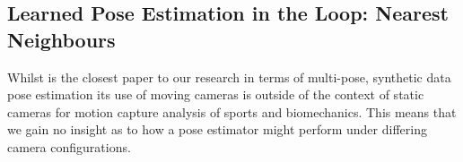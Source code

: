 

\subsection{Learned Pose Estimation in the Loop: Nearest Neighbours}


Whilst \citet{ci2023proactive} is the closest paper to our research in terms of multi-pose, synthetic data pose estimation its use of moving cameras is outside of the context of static cameras for motion capture analysis of sports and biomechanics.
This means that we gain no insight as to how a pose estimator might perform under differing camera configurations.

